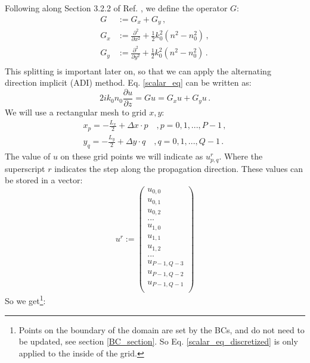 \documentclass[]{article}
\begin{document}
	Following along Section 3.2.2 of Ref. \cite{Lifante_2015}, we define the operator $G$:
	\begin{subequations}
		\begin{align}
			G &:= G_x+G_y \, ,\\
			G_x &:=\frac{\partial^2}{\partial x^2}+\frac{1}{2}k_0^2(n^2-n_0^2)\, ,\\
			G_y &:=\frac{\partial^2}{\partial y^2}+\frac{1}{2}k_0^2(n^2-n_0^2)\, .\\
		\end{align}		
	\end{subequations}
	This splitting is important later on, so that we can apply the alternating direction implicit (ADI) method. Eq. \eqref{scalar_eq} can be written as:
	\begin{equation}
		2i k_0 n_0 \frac{\partial u}{\partial z} = G u = G_x u + G_y u\, .
		\label{G_operator_on_u}
	\end{equation}
	We will use a rectangular mesh to grid $x,y$:
	\begin{subequations}
		\begin{align}
			x_p = -\frac{L_x}{2}+\Delta x\cdot p \quad, p = 0,1,...,P-1\, ,\\
			y_q = -\frac{L_y}{2}+\Delta y\cdot q \quad, q = 0,1,...,Q-1\, .
		\end{align}
	\end{subequations}
	The value of $u$ on these grid points we will indicate as $u_{p,q}^r$. Where the superscript $r$ indicates the step along the propagation direction. These values can be stored in a vector:
	\begin{equation}
		u^r := \begin{pmatrix}
			u_{0,0}\\
			u_{0,1}\\
			u_{0,2}\\
			...\\
			u_{1,0}\\
			u_{1,1}\\
			u_{1,2}\\
			...\\
			u_{P-1,Q-3}\\
			u_{P-1,Q-2}\\
			u_{P-1,Q-1}\\
			\end{pmatrix}
			\label{uvector}
	\end{equation}
	So we get\footnote{Points on the boundary of the domain are set by the BCs, and do not need to be updated, see section \ref{BC_section}. So Eq. \eqref{scalar_eq_discretized} is only applied to the inside of the grid.}:
\end{document}
